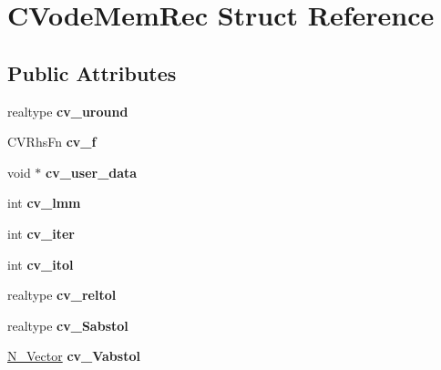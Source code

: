\hypertarget{structCVodeMemRec}{}\section{C\+Vode\+Mem\+Rec Struct Reference}
\label{structCVodeMemRec}
\subsection*{Public Attributes}
\begin{DoxyCompactItemize}
\item 
\mbox{\label{structCVodeMemRec_a07dc3f613bdc4f77116fd1166bd819ec}} 
realtype {\bfseries cv\+\_\+uround}
\item 
\mbox{\label{structCVodeMemRec_ad27368b1073eac7eda449c89612738b2}} 
C\+V\+Rhs\+Fn {\bfseries cv\+\_\+f}
\item 
\mbox{\label{structCVodeMemRec_a5214517899143cd0fe82a1bad3ae87bf}} 
void $\ast$ {\bfseries cv\+\_\+user\+\_\+data}
\item 
\mbox{\label{structCVodeMemRec_aa1e6b9a87fa6c4d17df0a6477ddafdef}} 
int {\bfseries cv\+\_\+lmm}
\item 
\mbox{\label{structCVodeMemRec_aaa4f4c20b33043ff391e23629ea0e115}} 
int {\bfseries cv\+\_\+iter}
\item 
\mbox{\label{structCVodeMemRec_a93a163d366ff75d00140ff8adb512310}} 
int {\bfseries cv\+\_\+itol}
\item 
\mbox{\label{structCVodeMemRec_a6297f79c6ad049f70bf94857bdf9b141}} 
realtype {\bfseries cv\+\_\+reltol}
\item 
\mbox{\label{structCVodeMemRec_aece3a318f559f0dc9b6a5572f4db54f7}} 
realtype {\bfseries cv\+\_\+\+Sabstol}
\item 
\mbox{\label{structCVodeMemRec_ad3c23040b13e8fe6b5a90826ce19bd8d}} 
\mbox{\hyperlink{struct__generic__N__Vector}{N\+\_\+\+Vector}} {\bfseries cv\+\_\+\+Vabstol}
\item 

\end{DoxyCompactItemize}
